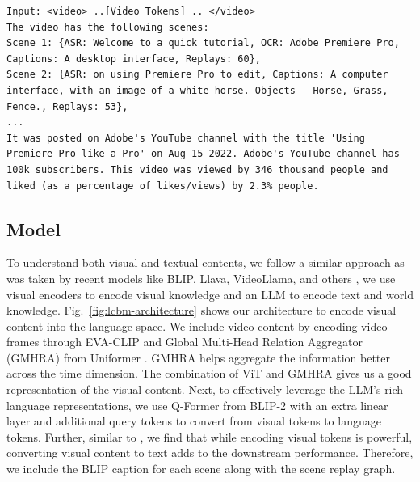 \begin{lstlisting}[caption={Verbalization pattern for inputting content and behavior in the same space},frame=single,label={lcbm:verbalization},basicstyle=\scriptsize]
Input: <video> ..[Video Tokens] .. </video> 
The video has the following scenes:
Scene 1: {ASR: Welcome to a quick tutorial, OCR: Adobe Premiere Pro, Captions: A desktop interface, Replays: 60}, 
Scene 2: {ASR: on using Premiere Pro to edit, Captions: A computer interface, with an image of a white horse. Objects - Horse, Grass, Fence., Replays: 53}, 
... 
It was posted on Adobe's YouTube channel with the title 'Using Premiere Pro like a Pro' on Aug 15 2022. Adobe's YouTube channel has 100k subscribers. This video was viewed by 346 thousand people and liked (as a percentage of likes/views) by 2.3% people.
\end{lstlisting}

\subsection{Model}
\label{sec:model}
To understand both visual and textual contents, we follow a similar approach as was taken by recent models like BLIP, Llava, VideoLlama, and others \citep{liu2023visual,ge2023planting,li2023blip2,zhu2023minigpt}, we use visual encoders to encode visual knowledge and an LLM to encode text and world knowledge. Fig.~\ref{fig:lcbm-architecture} shows our architecture to encode visual content into the language space. We include video content by encoding video frames through EVA-CLIP \citep{sun2023eva} and Global Multi-Head Relation Aggregator (GMHRA) from Uniformer \citep{li2021uniformer}. GMHRA helps aggregate the information better across the time dimension. The combination of ViT and GMHRA gives us a good representation of the visual content. Next, to effectively leverage the LLM’s rich language representations, we use Q-Former from BLIP-2 \citep{li2023blip2} with an extra linear layer and additional query tokens to convert from visual tokens to language tokens. Further, similar to \citet{bhattacharya2023video}, we find that while encoding visual tokens is powerful, converting visual content to text adds to the downstream performance. Therefore, we include the BLIP caption for each scene along with the scene replay graph. 


